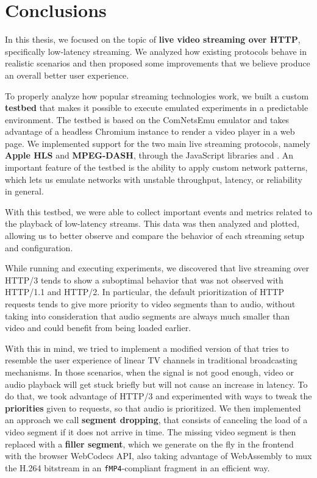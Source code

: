 \chapter{Conclusions}
\label{cha:conclusions}

In this thesis, we focused on the topic of \textbf{live video streaming over HTTP}, specifically low-latency streaming. We analyzed how existing protocols behave in realistic scenarios and then proposed some improvements that we believe produce an overall better user experience.

To properly analyze how popular streaming technologies work, we built a custom \textbf{testbed} that makes it possible to execute emulated experiments in a predictable environment. The testbed is based on the ComNetsEmu emulator and takes advantage of a headless Chromium instance to render a video player in a web page. We implemented support for the two main live streaming protocols, namely \textbf{Apple HLS} and \textbf{MPEG-DASH}, through the JavaScript libraries \hlsjs{} and \dashjs{}. An important feature of the testbed is the ability to apply custom network patterns, which lets us emulate networks with unstable throughput, latency, or reliability in general.

With this testbed, we were able to collect important events and metrics related to the playback of low-latency streams. This data was then analyzed and plotted, allowing us to better observe and compare the behavior of each streaming setup and configuration.

While running and executing experiments, we discovered that live streaming over HTTP/3 tends to show a suboptimal behavior that was not observed with HTTP/1.1 and HTTP/2. In particular, the default prioritization of HTTP requests tends to give more priority to video segments than to audio, without taking into consideration that audio segments are always much smaller than video and could benefit from being loaded earlier.

With this in mind, we tried to implement a modified version of \hlsjs{} that tries to resemble the user experience of linear TV channels in traditional broadcasting mechanisms. In those scenarios, when the signal is not good enough, video or audio playback will get stuck briefly but will not cause an increase in latency. To do that, we took advantage of HTTP/3 and experimented with ways to tweak the \textbf{priorities} given to requests, so that audio is prioritized. We then implemented an approach we call \textbf{segment dropping}, that consists of canceling the load of a video segment if it does not arrive in time. The missing video segment is then replaced with a \textbf{filler segment}, which we generate on the fly in the frontend with the browser WebCodecs API, also taking advantage of WebAssembly to mux the H.264 bitstream in an \texttt{fMP4}-compliant fragment in an efficient way.

